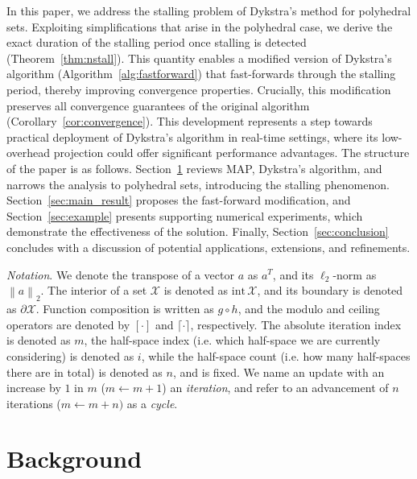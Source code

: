 \documentclass[onecolumn]{autart}
\newcommand{\twonorm}[1]{\left\| #1 \right\|_2}
\begin{document}
In this paper, we address the stalling problem of Dykstra's method for polyhedral sets. Exploiting simplifications that arise in the polyhedral case, we derive the exact duration of the stalling period once stalling is detected (Theorem~\ref{thm:nstall}). This quantity enables a modified version of Dykstra's algorithm (Algorithm~\ref{alg:fastforward}) that fast-forwards through the stalling period, thereby improving convergence properties. Crucially, this modification preserves all convergence guarantees of the original algorithm (Corollary~\ref{cor:convergence}). This development represents a step towards practical deployment of Dykstra's algorithm in real-time settings, where its low-overhead projection could offer significant performance advantages. The structure of the paper is as follows. Section~\ref{sec:background} reviews MAP, Dykstra's algorithm, and narrows the analysis to polyhedral sets, introducing the stalling phenomenon. Section~\ref{sec:main_result} proposes the fast-forward modification, and Section~\ref{sec:example} presents supporting numerical experiments, which demonstrate the effectiveness of the solution. Finally, Section~\ref{sec:conclusion} concludes with a discussion of potential applications, extensions, and refinements. 


\emph{Notation}.
We denote the transpose of a vector $a$ as $a^T$, and its $\ell_{2}$-norm as $\twonorm{a}$. The interior of a set $\mathcal{X}$ is denoted as $\text{int}\,\mathcal{X}$, and its boundary is denoted as $\partial\mathcal{X}$. Function composition is written as $g \circ h$, and the modulo and ceiling operators are denoted by $[\cdot]$ and $\lceil \cdot \rceil$, respectively. The absolute iteration index is denoted as $m$, the half-space index (i.e. which half-space we are currently considering) is denoted as $i$, while the half-space count (i.e. how many half-spaces there are in total) is denoted as $n$, and is fixed. We name an update with an increase by $1$ in $m$ ($m \leftarrow m+1$) an \emph{iteration}, and refer to an advancement of $n$ iterations ($m \leftarrow m+n)$ as a \emph{cycle}.

\section{Background} \label{sec:background}
\end{document}
